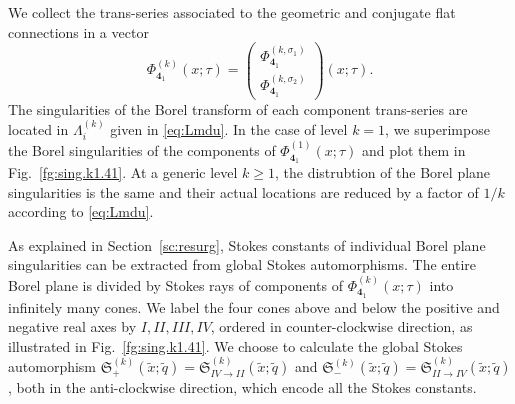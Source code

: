 \documentclass[a4paper,11pt]{article}	%
\def\md{\mathbf}
\def\mf{\mathfrak}
\def\tq{\tilde{q}}
\def\tx{\tilde{x}}
\newcommand{\s}{\sigma}
\newcommand{\knot}[1]{\md{#1}}
\begin{document}
We collect the trans-series associated to the geometric and conjugate
flat connections in a vector
\begin{equation}
  \Phi_{\knot{4}_1}^{(k)}(x;\tau) =
  \begin{pmatrix}
    \Phi_{\knot{4}_1}^{(k,\s_1)}\\
    \Phi_{\knot{4}_1}^{(k,\s_2)}
  \end{pmatrix}(x;\tau).
\end{equation}
The singularities of the Borel transform of each component
trans-series are located in $\Lambda_{i}^{(k)}$ given in
\eqref{eq:Lmdu}.  In the case of level $k=1$, we superimpose the Borel
singularities of the components of $\Phi_{\knot{4}_1}^{(1)}(x;\tau)$
and plot them in Fig.~\ref{fg:sing.k1.41}.
%
%
At a generic level $k\geq 1$, the
distrubtion of the Borel plane singularities is the same and their
actual locations are reduced by a factor of $1/k$ according to
\eqref{eq:Lmdu}.

%
As explained in Section~\ref{sc:resurg}, Stokes constants of
individual Borel plane singularities can be extracted from global
Stokes automorphisms.
%
The entire Borel plane is divided by Stokes rays of components of
$\Phi_{\knot{4}_1}^{(k)}(x;\tau)$ into infinitely many cones.  We
label the four cones above and below the positive and negative real
axes by $I,II,III,IV$, ordered in counter-clockwise direction, as
illustrated in Fig.~\ref{fg:sing.k1.41}.  We choose to calculate the
global Stokes automorphism
$\mf{S}_+^{(k)}(\tx;\tq) = \mf{S}^{(k)}_{IV\rightarrow II}(\tx;\tq)$
and
$\mf{S}_-^{(k)}(\tx;\tq) = \mf{S}^{(k)}_{II \rightarrow IV}(\tx;\tq)$,
both in the anti-clockwise direction, which encode all the Stokes
constants.
\end{document}

